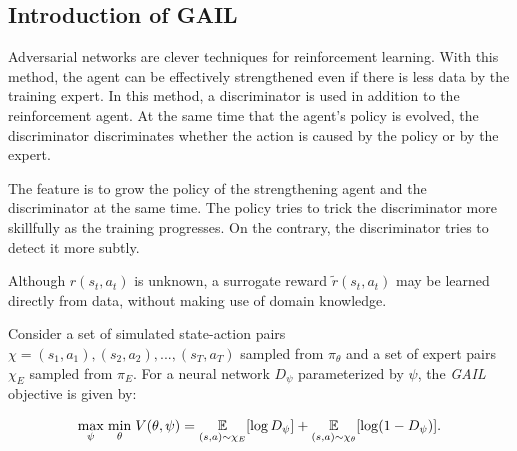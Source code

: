 \subsection{Introduction of GAIL}

Adversarial networks are clever techniques for reinforcement learning. With this method, the agent can be effectively strengthened even if there is less data by the training expert. In this method, a discriminator is used in addition to the reinforcement agent. At the same time that the agent's policy is evolved, the discriminator discriminates whether the action is caused by the policy or by the expert.

The feature is to grow the policy of the strengthening agent and the discriminator at the same time. The policy tries to trick the discriminator more skillfully as the training progresses. On the contrary, the discriminator tries to detect it more subtly.\cite{HoE16}

Although $r(s_t,a_t)$ is unknown, a surrogate reward $\tilde{r}(s_t,a_t)$ may be learned directly from data, without making use of domain knowledge. 

Consider a set of simulated state-action pairs $\chi=(s_1,a_1),(s_2,a_2),...,(s_T,a_T)$ sampled from $\pi_\theta$ and a set of expert pairs $\chi_E$ sampled from $\pi_E$. 
For a neural network $D_\psi$ parameterized by $\psi$, the {\it GAIL} objective is given by:

\begin{eqnarray}
\underset{\psi}{\max}\hspace{1mm}
\underset{\theta}{\min}\hspace{1mm}
V(\theta, \psi) = 
\underset{(s,a) \sim \chi_E}{\mathbb{E}}[\log D_{\psi}] + 
\underset{(s,a) \sim \chi_{\theta}}{\mathbb{E}}[\log(1 - D_{\psi})] .
\label{equ:objective}
\end{eqnarray}

